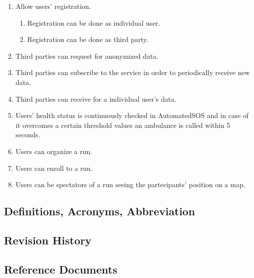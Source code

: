 \documentclass[a4paper]{article}
\begin{document}
    \begin{enumerate}[label*={G.\arabic*}]
        
        
        \item Allow users' registration.
        \begin{enumerate}[label*=.\arabic*]
            \item Registration can be done as individual user.
            \item Registration can be done as third party.
        \end{enumerate}
        
        \item Third parties can request for anonymized data.
    
        \item Third parties can subscribe to the service in order to periodically receive new data.
            
        \item Third parties can receive for a individual user's data.
        
        \item Users' health status is continuously checked in AutomatedSOS and in case of it overcomes a certain threshold values an ambulance is called within 5 seconds.
        
        \item Users can organize a run.
        \item Users can enroll to a run.
        \item Users can be spectators of a run seeing the partecipants' position on a map.
        
    \end{enumerate}
    
    \subsection{Definitions, Acronyms, Abbreviation}
    
    
    \subsection{Revision History}
    
    \subsection{Reference Documents}
    
\end{document}
